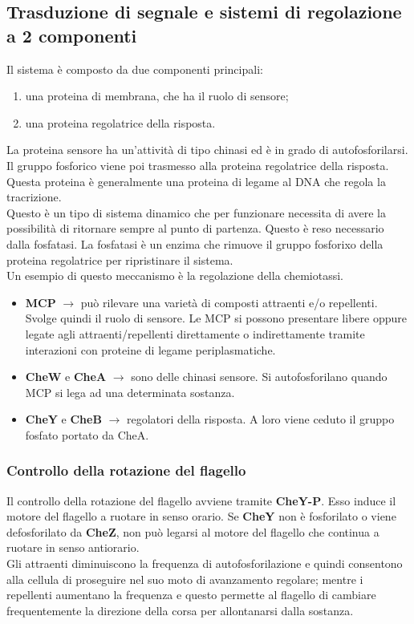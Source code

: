 \subsection{Trasduzione di segnale e sistemi di regolazione a 2 componenti}
Il sistema è composto da due componenti principali:
\begin{enumerate}
    \item una proteina di membrana, che ha il ruolo di sensore;
    \item una proteina regolatrice della risposta. 
\end{enumerate}
La proteina sensore ha un'attività di tipo chinasi ed è in grado di autofosforilarsi. Il gruppo fosforico viene poi trasmesso alla proteina regolatrice della risposta. Questa proteina è generalmente una proteina di legame al DNA che regola la tracrizione. 
\\Questo è un tipo di sistema dinamico che per funzionare necessita di avere la possibilità di ritornare sempre al punto di partenza. Questo è reso necessario dalla fosfatasi. La fosfatasi è un enzima che rimuove il gruppo fosforixo della proteina regolatrice per ripristinare il sistema.
\\Un esempio di questo meccanismo è la regolazione della chemiotassi.
\begin{itemize}
    \item \textbf{MCP} $\xrightarrow{}$ può rilevare una varietà di composti attraenti e/o repellenti. Svolge quindi il ruolo di sensore. Le MCP si possono presentare libere oppure legate agli attraenti/repellenti direttamente o indirettamente tramite interazioni con proteine di legame periplasmatiche. 
    \item \textbf{CheW} e \textbf{CheA} $\xrightarrow{}$ sono delle chinasi sensore. Si autofosforilano quando MCP si lega ad una determinata sostanza. 
    \item \textbf{CheY} e \textbf{CheB} $\xrightarrow{}$ regolatori della risposta. A loro viene ceduto il gruppo fosfato portato da CheA. 
\end{itemize}
\subsubsection{Controllo della rotazione del flagello}
Il controllo della rotazione del flagello avviene tramite \textbf{CheY-P}. Esso induce il motore del flagello a ruotare in senso orario. Se \textbf{CheY} non è fosforilato o viene defosforilato da \textbf{CheZ}, non può legarsi al motore del flagello che continua a ruotare in senso antiorario. 
\\Gli attraenti diminuiscono la frequenza di autofosforilazione e quindi consentono alla cellula di proseguire nel suo moto di avanzamento regolare; mentre i repellenti aumentano la frequenza e questo permette al flagello di cambiare frequentemente la direzione della corsa per allontanarsi dalla sostanza. 
